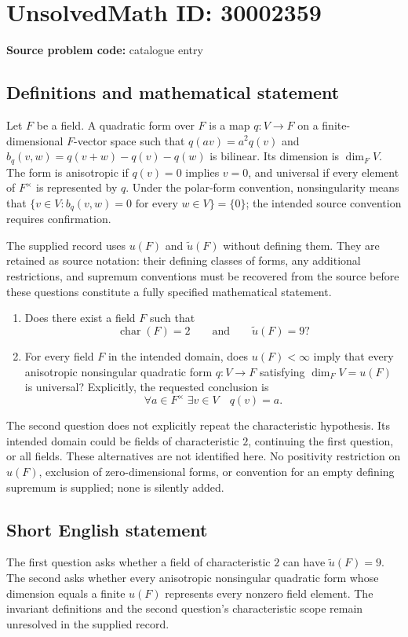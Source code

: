 \documentclass[11pt]{article}
\begin{document}
\section*{UnsolvedMath ID: 30002359}
\textbf{Source problem code:} catalogue entry
\subsection{Definitions and mathematical statement}
Let \(F\) be a field. A quadratic form over \(F\) is a map \(q\colon V\to F\) on a finite-dimensional \(F\)-vector space such that \(q(av)=a^2q(v)\) and \(b_q(v,w)=q(v+w)-q(v)-q(w)\) is bilinear. Its dimension is \(\dim_F V\). The form is anisotropic if \(q(v)=0\) implies \(v=0\), and universal if every element of \(F^\times\) is represented by \(q\). Under the polar-form convention, nonsingularity means that \(\{v\in V:b_q(v,w)=0\text{ for every }w\in V\}=\{0\}\); the intended source convention requires confirmation.

The supplied record uses \(u(F)\) and \(\widetilde u(F)\) without defining them. They are retained as source notation: their defining classes of forms, any additional restrictions, and supremum conventions must be recovered from the source before these questions constitute a fully specified mathematical statement.

\begin{enumerate}
\item Does there exist a field \(F\) such that
\[
\operatorname{char}(F)=2
\qquad\text{and}\qquad
\widetilde u(F)=9?
\]
\item For every field \(F\) in the intended domain, does \(u(F)<\infty\) imply that every anisotropic nonsingular quadratic form \(q\colon V\to F\) satisfying \(\dim_F V=u(F)\) is universal? Explicitly, the requested conclusion is
\[
\forall a\in F^\times\;\exists v\in V\quad q(v)=a.
\]
\end{enumerate}

The second question does not explicitly repeat the characteristic hypothesis. Its intended domain could be fields of characteristic \(2\), continuing the first question, or all fields. These alternatives are not identified here. No positivity restriction on \(u(F)\), exclusion of zero-dimensional forms, or convention for an empty defining supremum is supplied; none is silently added.
\subsection{Short English statement}
The first question asks whether a field of characteristic \(2\) can have \(\widetilde u(F)=9\). The second asks whether every anisotropic nonsingular quadratic form whose dimension equals a finite \(u(F)\) represents every nonzero field element. The invariant definitions and the second question's characteristic scope remain unresolved in the supplied record.
\end{document}
